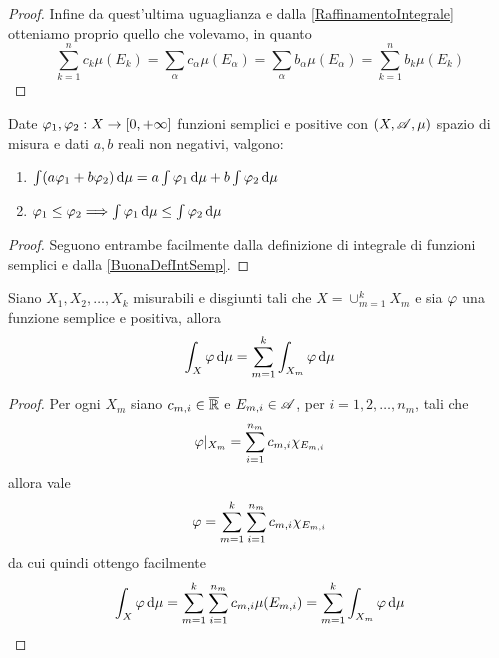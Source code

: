 \begin{proof}
	Infine da quest'ultima uguaglianza e dalla \cref{RaffinamentoIntegrale} otteniamo proprio quello che volevamo, in quanto
	\begin{equation*}
		\sum_{k=1}^n c_k \mu(E_k)=\sum_\alpha c_\alpha\mu(E_\alpha)=\sum_\alpha b_\alpha\mu(E_\alpha)=\sum_{k=1}^n b_k \mu(E_k)
	\end{equation*}
\end{proof}

\begin{proposition}\label{prop:IntegraleSemplici}
	Date $\varphi_1,\varphi_2:X\to[0,+\infty]$ funzioni semplici e positive con $(X,\mathscr A,\mu)$ spazio di misura e dati $a,b$ reali non negativi, valgono:
	\begin{enumerate}
		\item $\int (a\varphi_1+b\varphi_2)\,\mathrm d\mu=a\int \varphi_1\,\mathrm d\mu+b\int \varphi_2\,\mathrm d\mu$ \label{PIS:add}
		\item $\varphi_1\le \varphi_2\Longrightarrow \int \varphi_1\,\mathrm d\mu\le \int \varphi_2\,\mathrm d\mu$ \label{PIS:mono}
	\end{enumerate}
\end{proposition}
\begin{proof}
	Seguono entrambe facilmente dalla definizione di integrale di funzioni semplici e dalla \cref{BuonaDefIntSemp}.
\end{proof}

\begin{proposition}\label{IntegraleSempliciSpezzato}
	Siano $X_1,X_2,\dots,X_k$ misurabili e disgiunti tali che $X=\cup_{m=1}^kX_m$ e sia $\varphi$ una funzione semplice e positiva, allora
	\begin{equation*}
		\int_X \varphi \,\mathrm d \mu=\sum_{m=1}^k \int_{X_m}\varphi\,\mathrm d \mu
	\end{equation*}
\end{proposition}
\begin{proof}
	Per ogni $X_m$ siano $c_{m,i}\in\overline{\mathbb R}$ e $E_{m,i}\in\mathscr A$, per $i=1,2,\dots,n_m$, tali che 
	\begin{equation*}
		\varphi|_{X_m}=\sum_{i=1}^{n_m}c_{m,i}\chi_{E_{m,i}}
	\end{equation*}
	allora vale
	\begin{equation*}
		\varphi=\sum_{m=1}^k\sum_{i=1}^{n_m}c_{m,i}\chi_{E_{m,i}}
	\end{equation*}
	da cui quindi ottengo facilmente
	\begin{equation*}
		\int_X \varphi \,\mathrm d \mu=\sum_{m=1}^k\sum_{i=1}^{n_m}c_{m,i}\mu(E_{m,i})=\sum_{m=1}^k\int_{X_m}\varphi\,\mathrm d \mu
	\end{equation*}

\end{proof}



